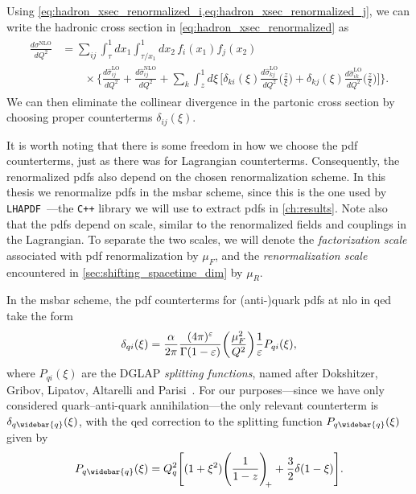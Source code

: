 Using \cref{eq:hadron_xsec_renormalized_i,eq:hadron_xsec_renormalized_j}, we can write the hadronic cross section in \cref{eq:hadron_xsec_renormalized} as
\begin{align}
\begin{split}
    \frac{d\sigma^{\mathrm{NLO}}}{dQ^2} &= \sum_{ij} \int_\tau^1 dx_1 \int_{\tau/x_1}^1 dx_2 \, f_i(x_1) f_j(x_2)
    \\ &\qquad
    \times \Biggl\{
        \frac{d\hat\sigma_{ij}^{\mathrm{LO}}}{dQ^2} + \frac{d\hat\sigma_{ij}^{\mathrm{NLO}}}{dQ^2}
        + \sum_k\int_z^1 d\xi \, \Biggl[
            \delta_{ki}(\xi) \frac{d\hat\sigma_{kj}^{\mathrm{LO}}}{dQ^2}\biggl(\frac{z}{\xi}\biggr)
            + \delta_{kj}(\xi) \frac{d\hat\sigma_{ik}^{\mathrm{LO}}}{dQ^2}\biggl(\frac{z}{\xi}\biggr)
        \Biggr]
    \Biggr\}.
\end{split}
\end{align}
We can then eliminate the collinear divergence in the partonic cross section by choosing proper counterterms $\delta_{ij}(\xi)$.

It is worth noting that there is some freedom in how we choose the \gls{pdf} counterterms, just as there was for Lagrangian counterterms.
Consequently, the renormalized \glspl{pdf} also depend on the chosen renormalization scheme.
In this thesis we renormalize \glspl{pdf} in the \gls{msbar} scheme, since this is the one used by \texttt{LHAPDF}~\cite{Buckley:2014ana}---the \texttt{C++} library we will use to extract \glspl{pdf} in \cref{ch:results}.
Note also that the \glspl{pdf} depend on scale, similar to the renormalized fields and couplings in the Lagrangian.
To separate the two scales, we will denote the \emph{factorization scale} associated with \gls{pdf} renormalization by $\mu_F$, and the \emph{renormalization scale} encountered in \cref{sec:shifting_spacetime_dim} by $\mu_R$.

In the \gls{msbar} scheme, the \gls{pdf} counterterms for (anti-)quark \glspl{pdf} at \gls{nlo} in \gls{qed} take the form~\cite{Denner:2019vbn}
\begin{equation}
    \delta_{qi}(\xi) = \frac{\alpha}{2\pi} \frac{(4\pi)^\varepsilon}{\Gamma(1-\varepsilon)}\biggl(\frac{\mu_F^2}{Q^2}\biggr) \frac{1}{\varepsilon} P_{qi}(\xi),
\end{equation}
where $P_{qi}(\xi)$ are the DGLAP \emph{splitting functions}, named after Dokshitzer, Gribov, Lipatov, Altarelli and Parisi~\cite{Dokshitzer:1977sg,Gribov:1972ri,Altarelli:1977zs}.
For our purposes---since we have only considered quark--anti-quark annihilation---the only relevant counterterm is $\delta_{q\widebar{q}}(\xi)$, with the \gls{qed} correction to the splitting function $P_{q\widebar{q}}(\xi)$ given by~\cite{deFlorian:2016gvk}
\begin{equation}
    P_{q\widebar{q}}(\xi) = Q_q^2 \Biggl[ (1+\xi^2) \plusdist + \frac{3}{2}\delta(1-\xi) \Biggr].
\end{equation}



